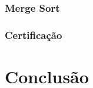 \documentclass[12pt, oneside, a4paper,english,brazil]{abntex2}
\begin{document}
\subsection{Merge Sort}

\subsection{Certifica\c{c}\~ao}

\chapter{Conclus\~ao}

\postextual


% 

\end{document}
